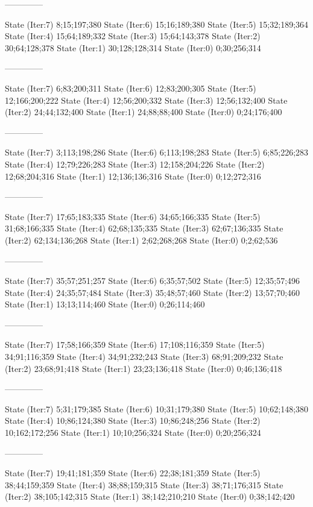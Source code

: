 \documentclass[a4paper,10pt,ngerman]{scrartcl}
\begin{document}
\begin{lstcs}
--------------

State (Iter:7) {8;15;197;380}
State (Iter:6) {15;16;189;380}
State (Iter:5) {15;32;189;364}
State (Iter:4) {15;64;189;332}
State (Iter:3) {15;64;143;378}
State (Iter:2) {30;64;128;378}
State (Iter:1) {30;128;128;314}
State (Iter:0) {0;30;256;314}

--------------

State (Iter:7) {6;83;200;311}
State (Iter:6) {12;83;200;305}
State (Iter:5) {12;166;200;222}
State (Iter:4) {12;56;200;332}
State (Iter:3) {12;56;132;400}
State (Iter:2) {24;44;132;400}
State (Iter:1) {24;88;88;400}
State (Iter:0) {0;24;176;400}

--------------

State (Iter:7) {3;113;198;286}
State (Iter:6) {6;113;198;283}
State (Iter:5) {6;85;226;283}
State (Iter:4) {12;79;226;283}
State (Iter:3) {12;158;204;226}
State (Iter:2) {12;68;204;316}
State (Iter:1) {12;136;136;316}
State (Iter:0) {0;12;272;316}

--------------

State (Iter:7) {17;65;183;335}
State (Iter:6) {34;65;166;335}
State (Iter:5) {31;68;166;335}
State (Iter:4) {62;68;135;335}
State (Iter:3) {62;67;136;335}
State (Iter:2) {62;134;136;268}
State (Iter:1) {2;62;268;268}
State (Iter:0) {0;2;62;536}

--------------

State (Iter:7) {35;57;251;257}
State (Iter:6) {6;35;57;502}
State (Iter:5) {12;35;57;496}
State (Iter:4) {24;35;57;484}
State (Iter:3) {35;48;57;460}
State (Iter:2) {13;57;70;460}
State (Iter:1) {13;13;114;460}
State (Iter:0) {0;26;114;460}

--------------

State (Iter:7) {17;58;166;359}
State (Iter:6) {17;108;116;359}
State (Iter:5) {34;91;116;359}
State (Iter:4) {34;91;232;243}
State (Iter:3) {68;91;209;232}
State (Iter:2) {23;68;91;418}
State (Iter:1) {23;23;136;418}
State (Iter:0) {0;46;136;418}

--------------

State (Iter:7) {5;31;179;385}
State (Iter:6) {10;31;179;380}
State (Iter:5) {10;62;148;380}
State (Iter:4) {10;86;124;380}
State (Iter:3) {10;86;248;256}
State (Iter:2) {10;162;172;256}
State (Iter:1) {10;10;256;324}
State (Iter:0) {0;20;256;324}

--------------

State (Iter:7) {19;41;181;359}
State (Iter:6) {22;38;181;359}
State (Iter:5) {38;44;159;359}
State (Iter:4) {38;88;159;315}
State (Iter:3) {38;71;176;315}
State (Iter:2) {38;105;142;315}
State (Iter:1) {38;142;210;210}
State (Iter:0) {0;38;142;420}


\end{lstcs}
\end{document}
